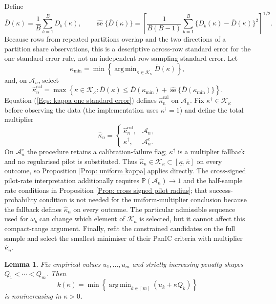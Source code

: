\documentclass[12pt]{article}
\DeclareMathOperator*{\argmin}{arg\,min}
\newenvironment{bluechange}{\begingroup\color[rgb]{0.00,0.00,1.00}}{\endgroup}
\newtheorem{lemma}{Lemma}
\theoremstyle{remark}
\theoremstyle{plain}
\begin{document}
\begin{bluechange}
Define
\[
\overline D(\kappa)=\frac1B\sum_{b=1}^B D_b(\kappa),
\qquad
\widehat{\operatorname{se}}\{\overline D(\kappa)\}
=\left[
\frac{1}{B(B-1)}\sum_{b=1}^B
\{D_b(\kappa)-\overline D(\kappa)\}^2
\right]^{1/2}.
\]
Because rows from repeated partitions overlap and the two directions of a partition share observations, this is a descriptive across-row standard error for the one-standard-error rule, not an independent-row sampling standard error.
Let
\[
\kappa_{\min}
=\min\left\{\argmin_{\kappa\in\mathcal K_\kappa}\overline D(\kappa)\right\},
\]
and, on $\mathcal A_n$, select
\begin{equation}\label{Eqs: kappa one standard error}
\widehat\kappa_n^{\mathrm{cal}}
=\max\left\{\kappa\in\mathcal K_\kappa:
\overline D(\kappa)
\le \overline D(\kappa_{\min})
+\widehat{\operatorname{se}}\{\overline D(\kappa_{\min})\}
\right\}.
\end{equation}
Equation (\ref{Eqs: kappa one standard error}) defines $\widehat\kappa_n^{\mathrm{cal}}$ on $\mathcal A_n$. Fix $\kappa^\dagger\in\mathcal K_\kappa$ before observing the data (the implementation uses $\kappa^\dagger=1$) and define the total multiplier
\[
\widehat\kappa_n=
\begin{cases}
\widehat\kappa_n^{\mathrm{cal}},&\mathcal A_n,\\
\kappa^\dagger,&\mathcal A_n^c.
\end{cases}
\]
On $\mathcal A_n^c$ the procedure retains a calibration-failure flag; $\kappa^\dagger$ is a multiplier fallback and no regularised pilot is substituted. Thus $\widehat\kappa_n\in\mathcal K_\kappa\subset[\underline\kappa,\overline\kappa]$ on every outcome, so Proposition \ref{Prop: uniform kappa} applies directly. The cross-signed pilot-rate interpretation additionally requires $\mathbb P(\mathcal A_n)\to1$ and the half-sample rate conditions in Proposition \ref{Prop: cross signed pilot radius}; that success-probability condition is not needed for the uniform-multiplier conclusion because the fallback defines $\widehat\kappa_n$ on every outcome.
The particular admissible sequence used for $\omega_b$ can change which element of $\mathcal K_\kappa$ is selected, but it cannot affect this compact-range argument.
Finally, refit the constrained candidates on the full sample and select the smallest minimiser of their PanIC criteria with multiplier $\widehat\kappa_n$.

\begin{lemma}\label{Lemma: multiplier monotonicity}
Fix empirical values $u_1,\ldots,u_m$ and strictly increasing penalty shapes $Q_1<\cdots<Q_m$. Then
\[
k(\kappa)=\min\left\{\argmin_{k\in[m]}(u_k+\kappa Q_k)\right\}
\]
is nonincreasing in $\kappa>0$.
\end{lemma}


\end{bluechange}
\end{document}
